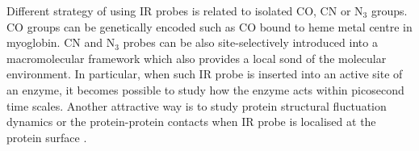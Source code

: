\documentclass[a4paper,titlepage,twoside,fleqn,12pt]{book}
\begin{document}
\begin{refsection}
Different strategy of using IR probes is related to isolated CO, CN or N$_3$ groups.
CO groups can be genetically encoded
such as CO bound to heme metal centre in myoglobin. 
CN and N$_3$ probes can be also site-selectively introduced into a macromolecular 
framework \citep{Jo.Culik.Korendovych.DeGrado.Gai.Biochem.2010,
Wang.Winblade.Johnson.Tirrell.Grabstein.ChemBioChem.2008,Fafarman.Webb.Chuang.Boxer.JACS.2006,
Kiick.Saxon.Tirrell.Bertozzi.PNAS.2002} 
which also provides
a local sond of the molecular environment. In particular, when such IR probe
is inserted into an active site of an enzyme, it becomes possible to study
how the enzyme acts within picosecond time scales. \citep{Fried.Bagchi.Boxer.Science.2014,Bagchi.Boxer.Fayer.JPCB.2012,
Ye.Zaitseva.Caltabiano.Schertler.Sakmar.Deupi.Vogel.Nature.2010} 
Another attractive way is to study protein structural fluctuation dynamics
or the protein-protein contacts when IR probe is localised at the protein 
surface \citep{Taskent-Sezgin.Chung.Banerjee.Nagarajan.Dyer.Carrico.Raleigh.AngewChemInt.2010,
Stafford.Ensign.Webb.JPCB.2010,Oh.Lee.Joo.Han.Cho.JPCB.2008}.  


\end{refsection}
\end{document}
